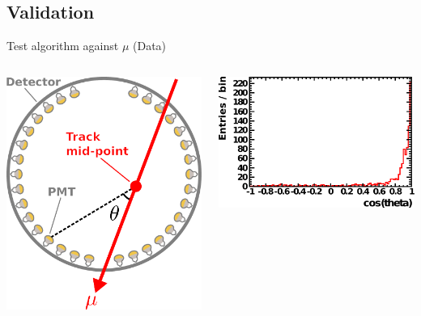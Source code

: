 \documentclass[14pt]{beamer}
\begin{document}
\subsection{Validation}
\begin{frame}{Test algorithm against $\mu$ (Data)}
	\begin{columns}[T]
		\begin{block}{}
			\vspace{5mm}
			\includegraphics[width=\linewidth]{through_going_muon.pdf}
		\end{block}
		\begin{block}{\centering{{\fontsize{10pt}{10pt}\selectfont{Agreement
			with $\mu$-fitter\\which uses\\entry/exit points\\~}}}}
			\includegraphics[width=\linewidth]{analyzed_rtq_run005000_agreementWithMuonFitter_t0Peak_prepulseCut1_0_05maxQThres_1000evts.pdf}

\end{block}
\end{columns}
\end{frame}
\end{document}
